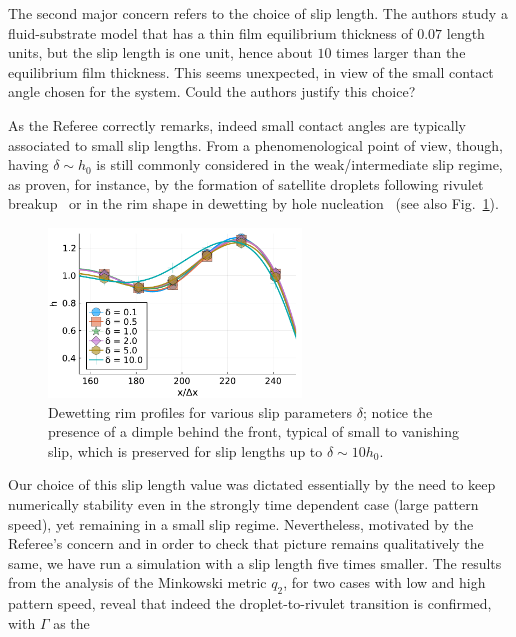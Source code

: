 \documentclass[12pt,english]{article}
\begin{document}
\begin{itemize}
{\item[ \textbf{\underline{Comment 2.}}]
The second major concern refers to the choice of slip length. 
The authors study a fluid-substrate model that has a thin film equilibrium thickness of 
$0.07$ length units, but the slip length is one unit, hence about $10$ times larger than the equilibrium film thickness. 
This seems unexpected, in view of the small contact angle chosen for the system. 
Could the authors justify this choice?
}

\item[ \textbf{Answer}]
{
As the Referee correctly remarks, indeed small contact angles are typically associated to small slip lengths. From a phenomenological point of view, 
though, having $\delta \sim h_0$ is still commonly considered in the weak/intermediate slip regime, as proven, for instance, 
by the formation of satellite 
droplets following rivulet breakup~\cite{doi:10.1073/pnas.1820487116} or 
in the rim shape in dewetting by hole nucleation~\cite{fetzer2007quantifying, munch2005lubrication} (see also Fig.~\ref{fig:slip}).
\begin{figure}
    \centering
    \includegraphics [width=0.6\textwidth]{slip_measure.pdf}
    \caption{Dewetting rim profiles for various slip parameters $\delta$; notice the presence of a dimple behind the front, typical of 
    small to vanishing slip, which is preserved for slip lengths up to 
    $\delta \sim 10 h_0$.}
    \label{fig:slip}
\end{figure}
Our choice of this slip length value was dictated essentially by the need 
to keep numerically stability even in the strongly time dependent case 
(large pattern speed), yet remaining in a small slip regime. 
Nevertheless, motivated by the Referee's concern and in order to check that 
picture remains qualitatively the same, we have run a simulation with 
a slip length five times smaller. The results from the analysis of the Minkowski metric $q_2$, for two cases with low and high pattern speed, reveal that indeed
the droplet-to-rivulet transition is confirmed, with $\Gamma$ as the 
}
\end{itemize}
\end{document}
